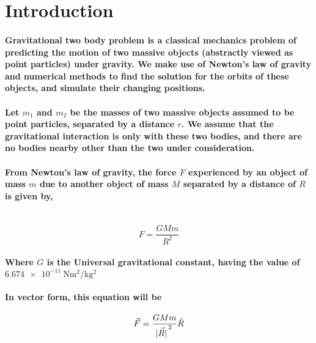 \section{Introduction}

\paragraph
{
    Gravitational two body problem is a classical mechanics problem of predicting the motion of two massive objects (abstractly viewed as point particles) under gravity. We make use of Newton's law of gravity and numerical methods to find the solution for the orbits of these objects, and simulate their changing positions.
}

\paragraph
{
    Let $m_1$ and $m_2$ be the masses of two massive objects assumed to be point particles, separated by a distance $r$. We assume that the gravitational interaction is only with these two bodies, and there are no bodies nearby other than the two under consideration.
}

\paragraph
{
    From Newton's law of gravity, the force $F$ experienced by an object of mass $m$ due to another object of mass $M$ separated by a distance of $R$ is given by,\\\\
}
\begin{equation}
    F = \frac{G M m}{R^2}
\end{equation}

\paragraph{
    Where $G$ is the Universal gravitational constant, having the value of
    $\SI{6.674e-11}{\newton \metre^2 \per \kg ^2}$
}

\paragraph{
    In vector form, this equation will be
}

\begin{equation}
    \vec{F} = \frac{G M m}{\vec{\abs{R}}^{\, 2}} \hat{R}
\end{equation}

